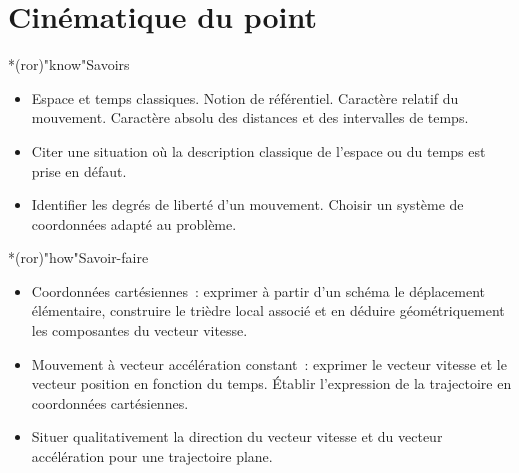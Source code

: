 \documentclass[../../main/main.tex]{subfiles}
\begin{document}
\setcounter{chapter}{0}

\chapter{Cin\'ematique du point}

\vfill

\begin{prgm}
	\begin{tcb}*(ror)"know"{Savoirs}
		\begin{itemize}
			\item Espace et temps classiques. Notion de référentiel. Caractère relatif
			      du mouvement. Caractère absolu des distances et des intervalles de
			      temps.
			\item Citer une situation où la description classique de l'espace ou du
			      temps est prise en défaut.

			\item Identifier les degrés de liberté d'un mouvement. Choisir un système
			      de coordonnées adapté au problème.
		\end{itemize}
	\end{tcb}
	\begin{tcb}*(ror)"how"{Savoir-faire}
		\begin{itemize}
			\item Coordonnées cartésiennes~: exprimer à partir d'un schéma le
			      déplacement élémentaire, construire le trièdre local associé et en
			      déduire géométriquement les composantes du vecteur vitesse.

			\item Mouvement à vecteur accélération constant~: exprimer le vecteur
			      vitesse et le vecteur position en fonction du temps. Établir
			      l'expression de la trajectoire en coordonnées cartésiennes.

			\item Situer qualitativement la direction du vecteur vitesse et du
			      vecteur accélération pour une trajectoire plane.
		\end{itemize}
	\end{tcb}
\end{prgm}

\vfill


\vfill
\minitoc
\vfill

\newpage
\end{document}
